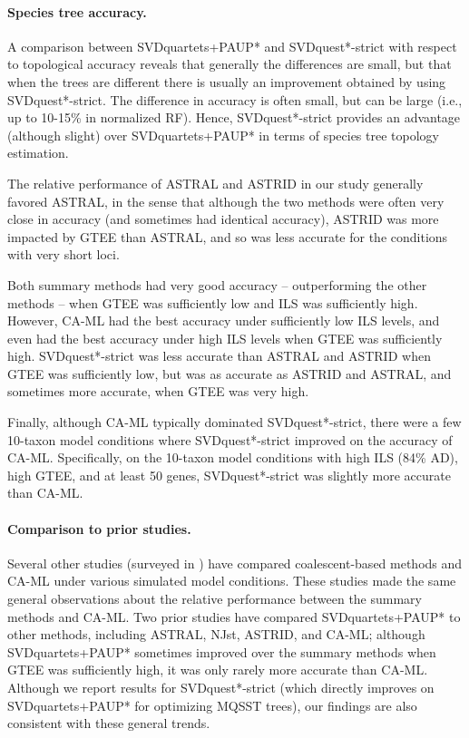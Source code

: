 \paragraph{Species tree accuracy. }


A comparison between SVDquartets+PAUP* and SVDquest*-strict with respect to topological accuracy reveals that
generally the differences are small, but that when the trees are different there is usually an improvement obtained
by using SVDquest*-strict. 
The difference in accuracy is often small, but can be large (i.e., up to 10-15\% in normalized RF). 
Hence, SVDquest*-strict provides an advantage (although slight) over SVDquartets+PAUP* in terms of species tree topology estimation.

The relative performance of ASTRAL and ASTRID in our study generally favored ASTRAL,
in the
sense that although the two methods were often very close in accuracy (and sometimes
had identical accuracy), ASTRID was more impacted by GTEE than ASTRAL, and so was
less accurate for the conditions with very short loci. 
 
Both summary methods had very good accuracy -- outperforming the other methods --
when GTEE was sufficiently low and ILS was sufficiently high.
However, 
CA-ML had the best accuracy
under sufficiently low ILS levels, and even had  the best accuracy
under high ILS levels when GTEE was
sufficiently high. 
SVDquest*-strict was less accurate than ASTRAL and ASTRID when GTEE was sufficiently low, but
was  as accurate as ASTRID and ASTRAL, and sometimes more accurate, when 
GTEE was very high.

Finally, although CA-ML typically dominated SVDquest*-strict, there
were  a few  10-taxon model conditions where SVDquest*-strict improved on the accuracy of CA-ML. 
Specifically, on the 10-taxon model conditions with high ILS (84\% AD), high GTEE, and at least 50 
genes, SVDquest*-strict was slightly more accurate than CA-ML.




\paragraph{Comparison to prior studies. }


Several other studies  (surveyed in \cite{MolloyWarnow2017}) have compared coalescent-based methods  and CA-ML under various simulated model conditions.
These studies made the same general observations about the relative performance between the summary methods and CA-ML. 
Two prior studies \cite{Chou2015,MolloyWarnow2017} have  compared SVDquartets+PAUP*  to  other methods, including ASTRAL,  NJst, ASTRID, and CA-ML;
although SVDquartets+PAUP* sometimes improved over the summary methods when GTEE was sufficiently high, it was only
rarely more accurate than CA-ML. 
Although we report results for SVDquest*-strict (which directly improves on SVDquartets+PAUP*  for optimizing
MQSST trees), our  findings are also consistent with these general trends.

